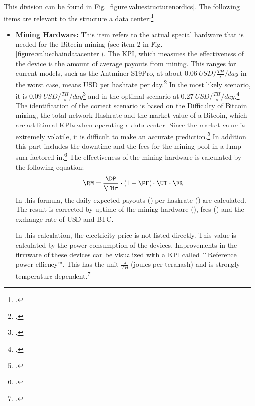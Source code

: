 This division can be found in Fig. \ref{figure:valuestructurenordics}. The following items are relevant to the structure
a data center:\footcite[Cf.][]{appendix:capex}
\begin{itemize}
    \item \textbf{Mining Hardware: }This item refers to the actual special hardware that is needed for the
    Bitcoin mining (see item 2 in Fig. \ref{figure:valuechaindatacenter}). The \ac{KPI}, which measures the
    effectiveness of the device is the amount of average payouts from mining. This ranges
    for current models, such as the Antminer S19Pro, at about $0.06\ USD / \frac{TH}{s} / day$ in the worst case, means
    \ac{USD} per hashrate per day.\footcite[Cf.][]{appendix:worstcasescenario} In the most likely scenario,
    it is $0.09\ USD / \frac{TH}{s} / day$\footcite[Cf.][]{appendix:mostprobablescenario} and in the optimal scenario
    at $0.27\ USD / \frac{TH}{s} / day$.\footcite[Cf.][]{appendix:optimalscenario} The identification of the correct
    scenario is based on the Difficulty of Bitcoin mining, the total network Hashrate and the market value
    of a Bitcoin, which are additional \acp{KPI} when operating a data center. Since the market value is extremely
    volatile, it is difficult to make an accurate prediction.\footcite[Cf.][p. 325]{badertscher2017bitcoin} In addition
    this part includes the downtime and the fees for the mining pool in a lump sum
    factored in.\footcite[Cf.][]{appendix:s19proassumptions} The effectiveness of the mining hardware is
    calculated by the following equation:
    \begin{equation}
        \RM = \frac{\DP}{\THr}\cdot(1-\PF)\cdot\UT\cdot\ER
    \end{equation}
    In this formula, the daily expected payouts (\DP) per hashrate (\THr) are calculated. The result is
    corrected by uptime of the mining hardware (\UT), fees (\PF) and the exchange rate of \ac{USD} and \ac{BTC}.

    In this calculation, the electricity price is not listed directly. This value is calculated by the power consumption of the
    devices. Improvements in the firmware of these devices can be visualized with a \ac{KPI} called
    "`Reference power effiency'". This has the unit $\frac{J}{TH}$ (joules per terahash) and is strongly
    temperature dependent.\footcite[Cf.][]{s19pro2021consumption}


\end{itemize}

